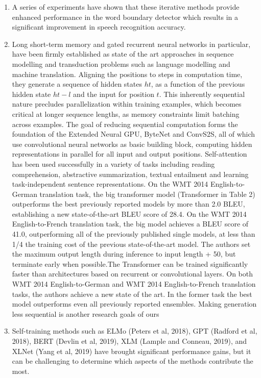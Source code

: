 \documentclass[11pt]{article}
\begin{document}
\begin{enumerate}
    \item A series of experiments have shown that these iterative methods provide enhanced performance in the word boundary detector which results in a significant improvement in speech recognition accuracy.\cite{chung}
    \item Long short-term memory\cite{lstm} and gated recurrent\cite{recurrent} neural networks in particular, have been firmly established as state of the art approaches in sequence modelling and transduction problems such as language modelling and machine translation.
    Aligning the positions to steps in computation time, they generate a sequence of hidden states $ ht $, as a function of the previous hidden state $ ht - l $ and the input for position $ t $. This inherently sequential nature precludes parallelization within training examples, which becomes critical at longer sequence lengths, as memory constraints limit batching across examples.
    The goal of reducing sequential computation forms the foundation of the Extended Neural GPU, ByteNet and ConvS2S, all of which use convolutional neural networks as basic building block, computing hidden representations in parallel for all input and output positions.
    Self-attention has been used successfully in a variety of tasks including reading comprehension, abstractive summarization, textual entailment and learning task-independent sentence representations. On the WMT 2014 English-to-German translation task, the big transformer model (Transformer in Table 2) outperforms the best previously reported models by more than 2.0 BLEU, establishing a new state-of-the-art BLEU score of 28.4.
    On the WMT 2014 English-to-French translation task, the big model achieves a BLEU score of 41.0, outperforming all of the previously published single models, at less than 1/4 the training cost of the previous state-of-the-art model.
    The authors set the maximum output length during inference to input length + 50, but terminate early when possible\cite{schuster}.The Transformer can be trained significantly faster than architectures based on recurrent or convolutional layers.
    On both WMT 2014 English-to-German and WMT 2014 English-to-French translation tasks, the authors achieve a new state of the art.
    In the former task the best model outperforms even all previously reported ensembles.
    Making generation less sequential is another research goals of ours\cite{atayl}
    \item Self-training methods such as ELMo (Peters et al, 2018), GPT (Radford et al, 2018), BERT (Devlin et al, 2019), XLM (Lample and Conneau, 2019), and XLNet (Yang et al, 2019) have brought significant performance gains, but it can be challenging to determine which aspects of the methods contribute the most.

\end{enumerate}
\end{document}
